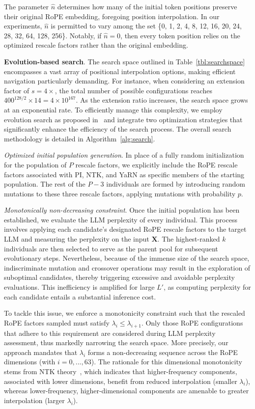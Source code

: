 The parameter $\hat{n}$ determines how many of the initial token positions preserve their original RoPE embedding, foregoing position interpolation. In our experiments, $\hat{n}$ is permitted to vary among the set \{0, 1, 2, 4, 8, 12, 16, 20, 24, 28, 32, 64, 128, 256\}. Notably, if $\hat{n}=0$, then every token position relies on the optimized rescale factors rather than the original embedding.

\textbf{Evolution-based search}. The search space outlined in Table~\ref{tbl:searchspace} encompasses a vast array of positional interpolation options, making efficient navigation particularly demanding. For instance, when considering an extension factor of $s=4\times$, the total number of possible configurations reaches $400^{128/2}\times14 = 4\times10^{167}$. As the extension ratio increases, the search space grows at an exponential rate. To efficiently manage this complexity, we employ evolution search as proposed in~\cite{guo2020single} and integrate two optimization strategies that significantly enhance the efficiency of the search process. The overall search methodology is detailed in Algorithm~\ref{alg:search}.

\textit{Optimized initial population generation}. In place of a fully random initialization for the population of $P$ rescale factors, we explicitly include the RoPE rescale factors associated with PI, NTK, and YaRN as specific members of the starting population. The rest of the $P-3$ individuals are formed by introducing random mutations to these three rescale factors, applying mutations with probability $p$.

\textit{Monotonically non-decreasing constraint}. Once the initial population has been established, we evaluate the LLM perplexity of every individual. This process involves applying each candidate’s designated RoPE rescale factors to the target LLM and measuring the perplexity on the input $\mathbf{X}$. The highest-ranked $k$ individuals are then selected to serve as the parent pool for subsequent evolutionary steps. Nevertheless, because of the immense size of the search space, indiscriminate mutation and crossover operations may result in the exploration of suboptimal candidates, thereby triggering excessive and avoidable perplexity evaluations. This inefficiency is amplified for large $L'$, as computing perplexity for each candidate entails a substantial inference cost.

To tackle this issue, we enforce a monotonicity constraint such that the rescaled RoPE factors sampled must satisfy $\lambda_i\le \lambda_{i+1}$. Only those RoPE configurations that adhere to this requirement are considered during LLM perplexity assessment, thus markedly narrowing the search space. More precisely, our approach mandates that $\lambda_i$ forms a non-decreasing sequence across the RoPE dimensions (with $i=0,...,63$). The rationale for this dimensional monotonicity stems from NTK theory~\cite{jacot2018neural,tancik2020fourier,ntk}, which indicates that higher-frequency components, associated with lower dimensions, benefit from reduced interpolation (smaller $\lambda_i$), whereas lower-frequency, higher-dimensional components are amenable to greater interpolation (larger $\lambda_i$).

